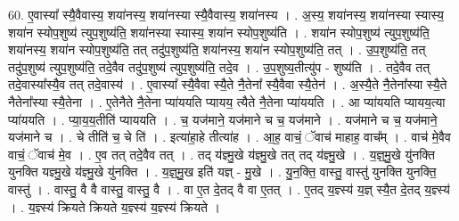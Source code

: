 \documentclass[17pt]{extarticle}
\begin{document}
60. ए॒वास्या᳚ स्यै॒वैवास्य॒ शया॑नस्य॒ शया॑नस्या स्यै॒वैवास्य॒ शया॑नस्य । . अ॒स्य॒ शया॑नस्य॒ शया॑नस्या स्यास्य॒ शया॑न स्योप॒शुष्य॑ त्युप॒शुष्य॑ति॒ शया॑नस्या स्यास्य॒ शया॑न स्योप॒शुष्य॑ति । . शया॑न स्योप॒शुष्य॑ त्युप॒शुष्य॑ति॒ शया॑नस्य॒ शया॑न स्योप॒शुष्य॑ति॒ तत् तदु॑प॒शुष्य॑ति॒ शया॑नस्य॒ शया॑न स्योप॒शुष्य॑ति॒ तत् । . उ॒प॒शुष्य॑ति॒ तत् तदु॑प॒शुष्य॑ त्युप॒शुष्य॑ति॒ तदे॒वैव तदु॑प॒शुष्य॑ त्युप॒शुष्य॑ति॒ तदे॒व । . उ॒प॒शुष्य॒तीत्यु॑प - शुष्य॑ति । . तदे॒वैव तत् तदे॒वास्या᳚स्यै॒व तत् तदे॒वास्य॑ । . ए॒वास्या᳚ स्यै॒वैवा स्यै॒ते नै॒तेना᳚ स्यै॒वैवा स्यै॒तेन॑ । . अ॒स्यै॒ते नै॒तेना᳚स्या स्यै॒ते नैतेना᳚स्या स्यै॒तेना । . ए॒तेनैते नै॒तेना प्या॑ययति प्यायय॒ त्यैते नै॒तेना प्या॑ययति । . आ प्या॑ययति प्यायय॒त्या प्या॑ययति । . प्या॒य॒य॒तीति॑ प्याययति । . च॒ यज॑माने॒ यज॑माने च च॒ यज॑माने । . यज॑माने च च॒ यज॑माने॒ यज॑माने च । . चे तीति॑ च॒ चे ति॑ । . इत्या॑हा॒हे तीत्या॑ह । . आ॒ह॒ वाचं॒ ॅवाच॑ माहाह॒ वाच᳚म् । . वाच॑ मे॒वैव वाचं॒ ॅवाच॑ मे॒व । . ए॒व तत् तदे॒वैव तत् । . तद् य॑ज्ञ्मु॒खे य॑ज्ञ्मु॒खे तत् तद् य॑ज्ञ्मु॒खे । . य॒ज्ञ्॒मु॒खे यु॑नक्ति युनक्ति यज्ञ्मु॒खे य॑ज्ञ्मु॒खे यु॑नक्ति । . य॒ज्ञ्॒मु॒ख इति॑ यज्ञ् - मु॒खे । . यु॒न॒क्ति॒ वास्तु॒ वास्तु॑ युनक्ति युनक्ति॒ वास्तु॑ । . वास्तु॒ वै वै वास्तु॒ वास्तु॒ वै । . वा ए॒त दे॒तद् वै वा ए॒तत् । . ए॒तद् य॒ज्ञ्स्य॑ य॒ज्ञ् स्यै॒त दे॒तद् य॒ज्ञ्स्य॑ । . य॒ज्ञ्स्य॑ क्रियते क्रियते य॒ज्ञ्स्य॑ य॒ज्ञ्स्य॑ क्रियते । \newline
\end{document}
